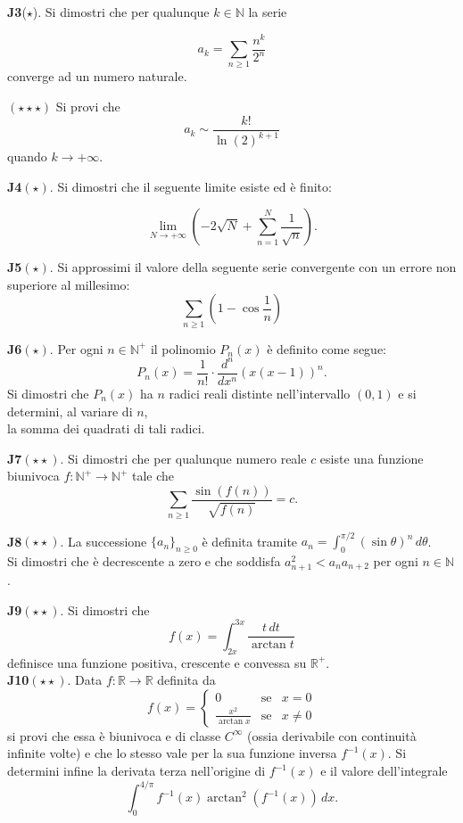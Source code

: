 \documentclass[a4paper,twoside]{article}
\theoremstyle{definition}
\numberwithin{theorem}{section}
\begin{document}
\textbf{J3}($\star$). Si dimostri che per qualunque $k\in\mathbb{N}$ la serie

 \begin{equation*}
    a_k = \sum_{n\geq 1}\frac{n^k}{2^n} 
 \end{equation*}
converge ad un numero naturale.  \par
$(\star\star\star)$ Si provi che 
\begin{equation*}
    a_k\sim \frac{k!}{\ln(2)^{k+1}}
\end{equation*} quando $k\to +\infty$.


\textbf{J4}$(\star)$. Si dimostri che il seguente limite esiste ed è finito:

$$ \lim_{N\to +\infty}\left(-2\sqrt{N}+\sum_{n=1}^{N}\frac{1}{\sqrt{n}}\right).$$

\textbf{J5}$(\star)$. Si approssimi il valore della seguente serie convergente con un errore non superiore al millesimo:
$$ \sum_{n\geq 1}\left(1-\cos\frac{1}{n}\right)$$

\textbf{J6}$(\star)$. Per ogni $n\in\mathbb{N}^+$ il polinomio $P_n(x)$ è definito come segue:
$$ P_n(x) = \frac{1}{n!}\cdot\frac{d^n}{dx^n}\left(x(x-1)\right)^n.$$
Si dimostri che $P_n(x)$ ha $n$ radici reali distinte nell'intervallo $(0,1)$ e si determini, al variare di $n$,\\ la somma dei quadrati di tali radici.

\textbf{J7}$(\star\star)$. Si dimostri che per qualunque numero reale $c$ esiste una funzione biunivoca $f:\mathbb{N}^+\to\mathbb{N}^+$ tale che 
$$ \sum_{n\geq 1}\frac{\sin(f(n))}{\sqrt{f(n)}} = c.$$

\textbf{J8}$(\star\star)$. La successione $\{a_n\}_{n\geq 0}$ è definita tramite $a_n=\int_{0}^{\pi/2}\left(\sin\theta\right)^n\,d\theta$.\\ Si dimostri che è decrescente a zero e che soddisfa $a_{n+1}^2 < a_n a_{n+2}$ per ogni $n\in\mathbb{N}$.

\textbf{J9}$(\star\star)$. Si dimostri che 
$$ f(x) = \int_{2x}^{3x}\frac{t\,dt}{\arctan t} $$
definisce una funzione positiva, crescente e convessa su $\mathbb{R^+}$. \\

\textbf{J10}$(\star\star)$. Data $f:\mathbb{R}\to\mathbb{R}$ definita da
$$ f(x) = \left\{\begin{array}{ccl}0 & \text{se} &x=0\\\frac{x^2}{\arctan x}&\text{se}& x\neq 0\end{array}\right.$$
si provi che essa è biunivoca e di classe $C^{\infty}$ (ossia derivabile con continuità infinite volte) e che lo stesso vale per la sua funzione inversa $f^{-1}(x)$. Si determini infine la derivata terza nell'origine di $f^{-1}(x)$ e il valore dell'integrale
$$ \int_{0}^{4/\pi}f^{-1}(x)\arctan^2(f^{-1}(x))\,dx.$$
\end{document}
